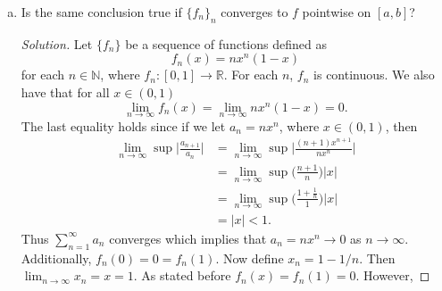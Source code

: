\documentclass[12pt]{article}
\newenvironment{solution}
{\renewcommand\qedsymbol{$\blacksquare$}\begin{proof}[Solution]}
{\end{proof}}
\begin{document}
\begin{enumerate}
\begin{enumerate}[(a)]
\begin{proof}
                        Finally, from the triangle inequality, we get that 
                        \begin{equation*}
                            |f_n(x_n)-f(x)|\leq|f_n(x_n)-f(x_n)|+|f(x_n)-f(x)|<\varepsilon.
                        \end{equation*}
                        Therefore $\lim_{n\to\infty}f_n(x_n)=f(x)$. 
                    \end{proof}
                \item Is the same conclusion true if $\{f_n\}_n$ converges to
                    $f$ pointwise on $[a, b]$?
                    \begin{solution}
                        Let $\{f_n\}$ be a sequence of functions defined as 
                        \begin{equation*}
                            f_n(x)=nx^n(1-x)
                        \end{equation*}
                        for each $n\in\mathbb{N}$, where $f_n:[0,
                        1]\to\mathbb{R}$. For each $n$, $f_n$ is continuous. We
                        also have that for all $x\in(0, 1)$
                        \begin{equation*}
                            \lim_{n\to\infty}f_n(x)=\lim_{n\to\infty}nx^n(1-x)=0.
                        \end{equation*}
                        The last equality holds since if we let $a_n=nx^n$,
                        where $x\in(0, 1)$, then 
                        \begin{align*}
                            \lim_{n\to\infty}\sup\bigg|\frac{a_{n+1}}{a_n}\bigg|
                            &=\lim_{n\to\infty}\sup\bigg|\frac{(n+1)x^{n+1}}{nx^n}\bigg|\\
                            &=\lim_{n\to\infty}\sup\bigg(\frac{n+1}{n}\bigg)|x|
                            \\
                            &=\lim_{n\to\infty}\sup\bigg(\frac{1+\frac{1}{n}}{1}\bigg)|x|\\
                            &=|x|<1.
                        \end{align*}
                        Thus $\sum_{n=1}^{\infty}a_n$ converges which implies
                        that $a_n=nx^n\to0$ as $n\to\infty$. Additionally,
                        $f_n(0)=0=f_n(1)$. Now define $x_n=1-1/n$. Then
                        $\lim_{n\to\infty}x_n=x=1$. As stated before
                        $f_n(x)=f_n(1)=0$. However, 

\end{solution}
\end{enumerate}
\end{enumerate}
\end{document}
